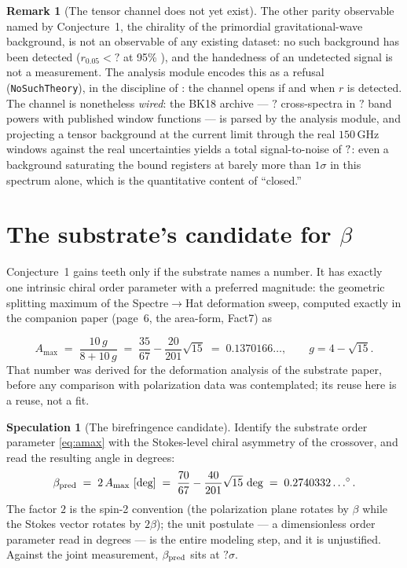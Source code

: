 \documentclass[11pt,a4paper]{article}
\newcommand{\CFBetaPull}{?}\newcommand{\CFBetaSigma}{?}
\newcommand{\CFRUpper}{?}\newcommand{\CFSigAmpACT}{?}
\newcommand{\CFBKNSpectra}{?}\newcommand{\CFBKNBins}{?}
\theoremstyle{plain}
\theoremstyle{definition}
\newtheorem{spec}{Speculation}
\newtheorem{remark}{Remark}
\begin{document}
\begin{remark}[The tensor channel does not yet exist]
The other parity observable named by Conjecture~1, the chirality of the
primordial gravitational-wave background, is not an observable of any
existing dataset: no such background has been detected
($r_{0.05}<\CFRUpper$ at 95\% \cite{BK18}), and the handedness of an
undetected signal is not a measurement. The analysis module encodes
this as a refusal (\texttt{NoSuchTheory}), in the discipline of
\cite{SuppStrings}: the channel opens if and when $r$ is detected. The
channel is nonetheless \emph{wired}: the BK18 archive \cite{BK18} ---
$\CFBKNSpectra$ cross-spectra in $\CFBKNBins$ band powers with
published window functions --- is parsed by the analysis module, and
projecting a tensor background at the current limit through the real
$150\,$GHz windows against the real uncertainties yields a total
signal-to-noise of $?$: even a background saturating the
bound registers at barely more than $1\sigma$ in this spectrum alone,
which is the quantitative content of ``closed.''
\end{remark}

\section{The substrate's candidate for $\beta$}
\label{sec:candidate}

Conjecture~1 gains teeth only if the substrate names a number. It has
exactly one intrinsic chiral order parameter with a preferred magnitude:
the geometric splitting maximum of the Spectre$\to$Hat deformation
sweep, computed exactly in the companion paper (page~6, the area-form, Fact7) as

\begin{equation}
A_{\max}\;=\;\frac{10\,g}{8+10\,g}
\;=\;\frac{35}{67}-\frac{20}{201}\sqrt{15}
\;=\;0.1370166\ldots,
\qquad g=4-\sqrt{15}.
\label{eq:amax}
\end{equation}
That number was derived for the deformation analysis of the substrate
paper, before any comparison with polarization data was contemplated;
its reuse here is a reuse, not a fit.

\begin{spec}[The birefringence candidate]
\label{spec:beta}
Identify the substrate order parameter \cref{eq:amax} with the
Stokes-level chiral asymmetry of the crossover, and read the resulting
angle in degrees:
\begin{equation}
\beta_{\rm pred}
\;=\;2\,A_{\max}\ \mathrm{[deg]}
\;=\;\frac{70}{67}-\frac{40}{201}\sqrt{15}\ \mathrm{deg}
\;=\;0.2740332\ldots^{\circ}.
\label{eq:betapred}
\end{equation}
The factor $2$ is the spin-2 convention (the polarization plane rotates
by $\beta$ while the Stokes vector rotates by $2\beta$); the unit
postulate --- a dimensionless order parameter read in degrees --- is
the entire modeling step, and it is unjustified. Against the joint
measurement, $\beta_{\rm pred}$ sits at $\CFBetaPull\sigma$.
\end{spec}
\end{document}
